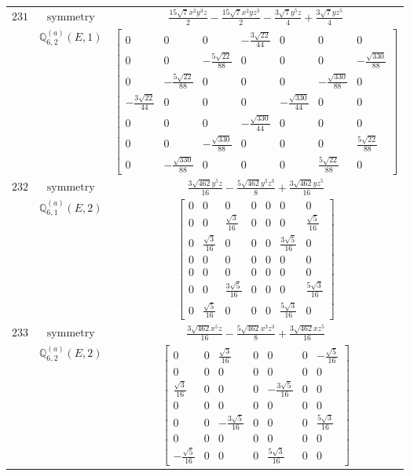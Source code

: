 \documentclass[fleqn,8pt,landscape]{jsarticle}
\begin{document}
\begin{longtable}{ccc}
$ 231 $ & $ \text{symmetry} $ & $ \frac{15 \sqrt{7} x^{2} y^{3} z}{2} - \frac{15 \sqrt{7} x^{2} y z^{3}}{2} - \frac{3 \sqrt{7} y^{5} z}{4} + \frac{3 \sqrt{7} y z^{5}}{4} $ \\
$  $ & $ \mathbb{Q}_{6,2}^{(a)}(E,1) $ & $ \begin{bmatrix} 0 & 0 & 0 & - \frac{3 \sqrt{22}}{44} & 0 & 0 & 0 \\ 0 & 0 & - \frac{5 \sqrt{22}}{88} & 0 & 0 & 0 & - \frac{\sqrt{330}}{88} \\ 0 & - \frac{5 \sqrt{22}}{88} & 0 & 0 & 0 & - \frac{\sqrt{330}}{88} & 0 \\ - \frac{3 \sqrt{22}}{44} & 0 & 0 & 0 & - \frac{\sqrt{330}}{44} & 0 & 0 \\ 0 & 0 & 0 & - \frac{\sqrt{330}}{44} & 0 & 0 & 0 \\ 0 & 0 & - \frac{\sqrt{330}}{88} & 0 & 0 & 0 & \frac{5 \sqrt{22}}{88} \\ 0 & - \frac{\sqrt{330}}{88} & 0 & 0 & 0 & \frac{5 \sqrt{22}}{88} & 0 \end{bmatrix} $ \\ \hline
$ 232 $ & $ \text{symmetry} $ & $ \frac{3 \sqrt{462} y^{5} z}{16} - \frac{5 \sqrt{462} y^{3} z^{3}}{8} + \frac{3 \sqrt{462} y z^{5}}{16} $ \\
$  $ & $ \mathbb{Q}_{6,1}^{(a)}(E,2) $ & $ \begin{bmatrix} 0 & 0 & 0 & 0 & 0 & 0 & 0 \\ 0 & 0 & \frac{\sqrt{3}}{16} & 0 & 0 & 0 & \frac{\sqrt{5}}{16} \\ 0 & \frac{\sqrt{3}}{16} & 0 & 0 & 0 & \frac{3 \sqrt{5}}{16} & 0 \\ 0 & 0 & 0 & 0 & 0 & 0 & 0 \\ 0 & 0 & 0 & 0 & 0 & 0 & 0 \\ 0 & 0 & \frac{3 \sqrt{5}}{16} & 0 & 0 & 0 & \frac{5 \sqrt{3}}{16} \\ 0 & \frac{\sqrt{5}}{16} & 0 & 0 & 0 & \frac{5 \sqrt{3}}{16} & 0 \end{bmatrix} $ \\ \hline
$ 233 $ & $ \text{symmetry} $ & $ \frac{3 \sqrt{462} x^{5} z}{16} - \frac{5 \sqrt{462} x^{3} z^{3}}{8} + \frac{3 \sqrt{462} x z^{5}}{16} $ \\
$  $ & $ \mathbb{Q}_{6,2}^{(a)}(E,2) $ & $ \begin{bmatrix} 0 & 0 & \frac{\sqrt{3}}{16} & 0 & 0 & 0 & - \frac{\sqrt{5}}{16} \\ 0 & 0 & 0 & 0 & 0 & 0 & 0 \\ \frac{\sqrt{3}}{16} & 0 & 0 & 0 & - \frac{3 \sqrt{5}}{16} & 0 & 0 \\ 0 & 0 & 0 & 0 & 0 & 0 & 0 \\ 0 & 0 & - \frac{3 \sqrt{5}}{16} & 0 & 0 & 0 & \frac{5 \sqrt{3}}{16} \\ 0 & 0 & 0 & 0 & 0 & 0 & 0 \\ - \frac{\sqrt{5}}{16} & 0 & 0 & 0 & \frac{5 \sqrt{3}}{16} & 0 & 0 \end{bmatrix} $ \\ \hline

\end{longtable}
\end{document}
